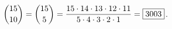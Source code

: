 $\dbinom{15}{10}=\dbinom{15}{5}=\dfrac{15\cdot14\cdot13\cdot12\cdot11}{5\cdot4\cdot3\cdot2\cdot1}=\boxed{3003}$.
